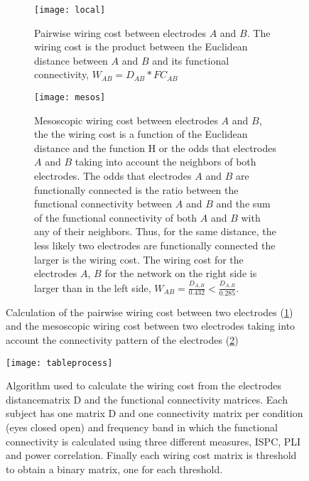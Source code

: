 \documentclass[11pt, onecolumn]{article}
\begin{document}
{\begin{figure}[ht] 
  \begin{subfigure}[t]{0.5\linewidth}
    \centering
    \texttt{[image: local]} 
    \caption{Pairwise wiring cost between electrodes $A$ and $B$. The wiring cost is the product between the Euclidean distance between $A$ and $B$ and its functional connectivity, $W_{AB} = D_{AB} * FC_{AB}$} 
    \label{fig:wca} 
    \vspace{4ex}
  \end{subfigure}%
  \hspace{1ex}
  \begin{subfigure}[t]{0.5\linewidth}
    \centering
    \texttt{[image: mesos]} 
    \caption{Mesoscopic wiring cost between electrodes $A$ and $B$, the the wiring cost is a function of the Euclidean distance and the function H or the odds that electrodes $A$ and $B$ taking into account the neighbors of both electrodes. The odds that electrodes $A$ and $B$ are functionally connected is the ratio between the functional connectivity between $A$ and $B$ and the sum of the functional connectivity of both $A$ and $B$ with any of their neighbors. Thus, for the same distance, the less likely two electrodes are functionally connected the larger is the wiring cost. The wiring cost for the electrodes $A$, $B$ for the network on the right side is larger than in the left side, $W_{AB} = \frac{D_{A,B}}{0.432} < \frac{D_{A,B}}{0.285}$.} 
    \label{fig:wcb} 
    \vspace{4ex}
  \end{subfigure} 
  \caption{Calculation of the pairwise wiring cost between two electrodes (\ref{fig:wca}) and the mesoscopic wiring cost between two electrodes taking into account the connectivity pattern of the electrodes (\ref{fig:wcb})}
  \label{fig:wc} 
\end{figure}



\begin{figure}
\centering
\texttt{[image: tableprocess]} 
 \caption{Algorithm used to calculate the wiring cost from the electrodes distancematrix D and the functional connectivity matrices. Each subject has one matrix D and one connectivity matrix per condition (eyes closed open) and frequency band in which the functional connectivity is calculated using three different measures, ISPC, PLI and power correlation. Finally each wiring cost matrix is threshold to obtain a binary matrix, one for each threshold.}
  \label{fig:algo}
\end{figure}

}
\end{document}

